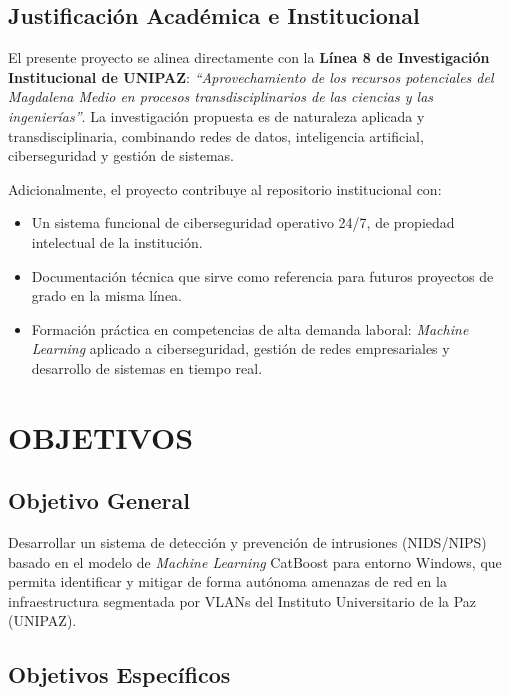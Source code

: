 \documentclass[12pt, letterpaper, oneside]{report}
\begin{document}
\section{Justificación Académica e Institucional}

El presente proyecto se alinea directamente con la \textbf{Línea 8 de Investigación Institucional de UNIPAZ}: \textit{``Aprovechamiento de los recursos potenciales del Magdalena Medio en procesos transdisciplinarios de las ciencias y las ingenierías''}. La investigación propuesta es de naturaleza aplicada y transdisciplinaria, combinando redes de datos, inteligencia artificial, ciberseguridad y gestión de sistemas.

Adicionalmente, el proyecto contribuye al repositorio institucional con:

\begin{itemize}[leftmargin=*]
  \item Un sistema funcional de ciberseguridad operativo 24/7, de propiedad intelectual de la institución.
  \item Documentación técnica que sirve como referencia para futuros proyectos de grado en la misma línea.
  \item Formación práctica en competencias de alta demanda laboral: \textit{Machine Learning} aplicado a ciberseguridad, gestión de redes empresariales y desarrollo de sistemas en tiempo real.
\end{itemize}

\chapter{OBJETIVOS}

\section{Objetivo General}

Desarrollar un sistema de detección y prevención de intrusiones (NIDS/NIPS) basado en el modelo de \textit{Machine Learning} CatBoost para entorno Windows, que permita identificar y mitigar de forma autónoma amenazas de red en la infraestructura segmentada por VLANs del Instituto Universitario de la Paz (UNIPAZ).

\section{Objetivos Específicos}
\end{document}

